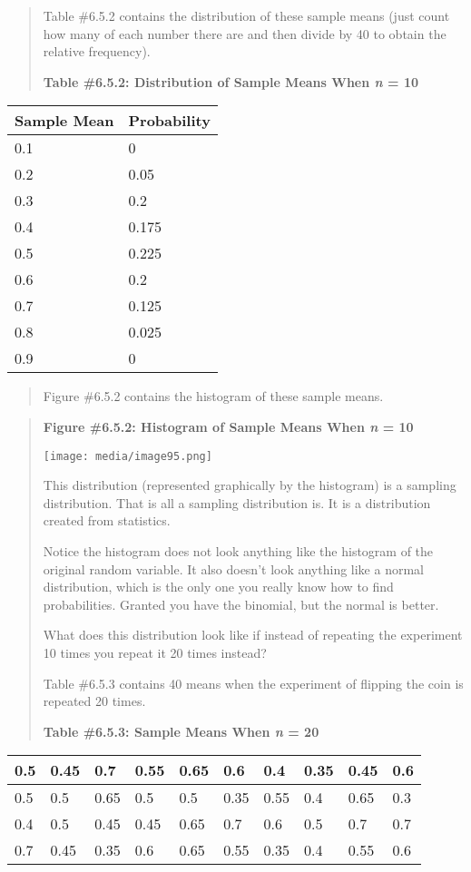 \documentclass[]{book}
\begin{document}
\begin{quote}
Table \#6.5.2 contains the distribution of these sample means (just count how many of each number there are and then divide by 40 to obtain the relative frequency).

\textbf{Table \#6.5.2: Distribution of Sample Means When \emph{n} = 10}
\end{quote}

\begin{longtable}[]{@{}ll@{}}
\toprule
Sample Mean & Probability\tabularnewline
\midrule
\endhead
0.1 & 0\tabularnewline
0.2 & 0.05\tabularnewline
0.3 & 0.2\tabularnewline
0.4 & 0.175\tabularnewline
0.5 & 0.225\tabularnewline
0.6 & 0.2\tabularnewline
0.7 & 0.125\tabularnewline
0.8 & 0.025\tabularnewline
0.9 & 0\tabularnewline
\bottomrule
\end{longtable}

\begin{quote}
Figure \#6.5.2 contains the histogram of these sample means.
\end{quote}

\begin{quote}
\textbf{Figure \#6.5.2: Histogram of Sample Means When \emph{n} = 10}

\texttt{[image: media/image95.png]}

This distribution (represented graphically by the histogram) is a
sampling distribution. That is all a sampling distribution is. It is a
distribution created from statistics.

Notice the histogram does not look anything like the histogram of the original random variable. It also doesn't look anything like a normal distribution, which is the only one you really know how to find probabilities. Granted you have the binomial, but the normal is better.

What does this distribution look like if instead of repeating the experiment 10 times you repeat it 20 times instead?

Table \#6.5.3 contains 40 means when the experiment of flipping the coin is repeated 20 times.

\textbf{Table \#6.5.3: Sample Means When \emph{n} = 20}
\end{quote}

\begin{longtable}[]{@{}llllllllll@{}}
\toprule
0.5 & 0.45 & 0.7 & 0.55 & 0.65 & 0.6 & 0.4 & 0.35 & 0.45 & 0.6\tabularnewline
\midrule
\endhead
0.5 & 0.5 & 0.65 & 0.5 & 0.5 & 0.35 & 0.55 & 0.4 & 0.65 & 0.3\tabularnewline
0.4 & 0.5 & 0.45 & 0.45 & 0.65 & 0.7 & 0.6 & 0.5 & 0.7 & 0.7\tabularnewline
0.7 & 0.45 & 0.35 & 0.6 & 0.65 & 0.55 & 0.35 & 0.4 & 0.55 & 0.6\tabularnewline
\bottomrule
\end{longtable}
\end{document}
